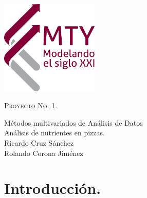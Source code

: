 \documentclass[12pt, letterpaper]{article}
\begin{document}
\begin{minipage}[c][0.6\textheight][t]{0.2\textwidth}
\begin{center}
\hskip2pt
\vrule width2.5pt height10cm
        \hskip1mm
        \vrule width1pt height10cm \\ \vspace{2cm}
        \includegraphics[height=4.5cm]{mty}
        \end{center}
\end{minipage}
\begin{minipage}[c][0.9\textheight][t]{0.65\textwidth}
  \begin{center}

	
    \vspace{3.2cm}
    

  \scshape Proyecto No. 1.\\ \normalsize
  
  \vspace{2cm}  
  
    
            
    Métodos multivariados de Análisis de Datos\\
    \vspace{1cm}   
    Análisis de nutrientes en pizzas.\\
    \vspace{1cm}   
    \vspace{1cm}   
    Ricardo Cruz Sánchez\\
    Rolando Corona Jiménez
    \vspace{.5cm}   
  \end{center}
  
\end{minipage}

\pagebreak
\tableofcontents

\cleardoublepage
\pagebreak
\section{Introducción.}
\end{document}
